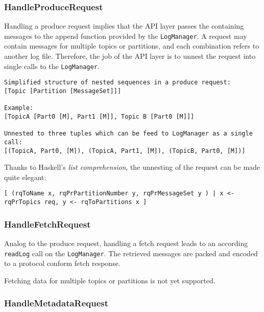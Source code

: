 \newpage
\subsubsection{HandleProduceRequest}
\label{subsec:broker-api-producerequest}

Handling a produce request implies that the API layer passes the containing
messages to the append function provided by the \lstinline{LogManager}. A
request may contain messages for multiple topics or partitions, and each
combination refers to another log file. Therefore, the job of the API layer is
to unnest the request into single calls to the \lstinline{LogManager}.

\begin{verbatim}
Simplified structure of nested sequences in a produce request:
[Topic [Partition [MessageSet]]]

Example:
[TopicA [Part0 [M], Part1 [M]], Topic B [Part0 [M]]]

Unnested to three tuples which can be feed to LogManager as a single call:
[(TopicA, Part0, [M]), (TopicA, Part1, [M]), (TopicB, Part0, [M])]

\end{verbatim}

Thanks to Haskell's \textit{list comprehension}, the unnesting of the request
can be made quite elegant:

\begin{lstlisting}[caption={List comprehension for unnesting produce request}]
[ (rqToName x, rqPrPartitionNumber y, rqPrMessageSet y ) | x <- rqPrTopics req, y <- rqToPartitions x ]
\end{lstlisting}

\subsubsection{HandleFetchRequest}
\label{subsec:broker-api-fetchrequest}

Analog to the produce request, handling a fetch request leads to an according
\lstinline{readLog} call on the \lstinline{LogManager}. The retrieved messages
are packed and encoded to a protocol conform fetch response.

Fetching data for multiple topics or partitions is not yet supported.

\subsubsection{HandleMetadataRequest}


